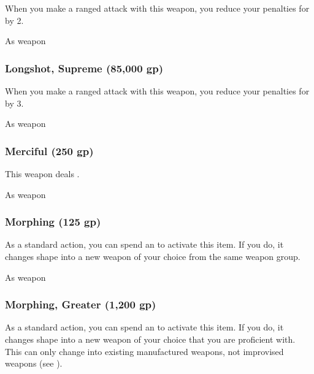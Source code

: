 When you make a ranged attack with this weapon, you reduce your penalties for  by 2.



 As weapon


\lowercase{\hypertarget{item:Longshot, Supreme}{}}\label{item:Longshot, Supreme}
\hypertarget{item:Longshot, Supreme}{\subsubsection{Longshot, Supreme\hfill{} (85,000 gp)}}

When you make a ranged attack with this weapon, you reduce your penalties for  by 3.



 As weapon


\lowercase{\hypertarget{item:Merciful}{}}\label{item:Merciful}
\hypertarget{item:Merciful}{\subsubsection{Merciful\hfill{} (250 gp)}}

This weapon deals .



 As weapon


\lowercase{\hypertarget{item:Morphing}{}}\label{item:Morphing}
\hypertarget{item:Morphing}{\subsubsection{Morphing\hfill{} (125 gp)}}

As a standard action, you can spend an  to activate this item.
If you do, it changes shape into a new weapon of your choice from the same weapon group.



 


 As weapon


\lowercase{\hypertarget{item:Morphing, Greater}{}}\label{item:Morphing, Greater}
\hypertarget{item:Morphing, Greater}{\subsubsection{Morphing, Greater\hfill{} (1,200 gp)}}

As a standard action, you can spend an  to activate this item.
If you do, it changes shape into a new weapon of your choice that you are proficient with.
This can only change into existing manufactured weapons, not improvised weapons (see ).



